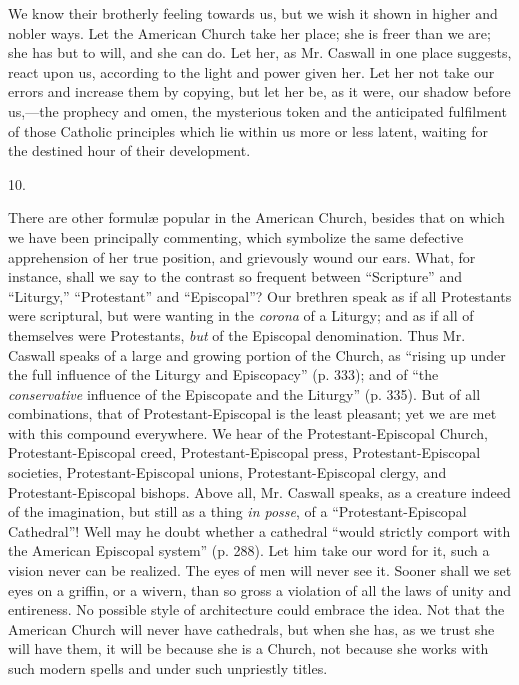 We know their brotherly feeling towards us, but
we wish it shown in higher and nobler ways. Let the American Church
take her place; she is freer than we are; she has but to will, and she
can do. Let her, as Mr. Caswall in one place suggests, react upon us,
according to the light and power given her. Let her not take our
errors and increase them by copying, but let her be, as it were, our
shadow before us,—the prophecy and omen, the mysterious token and
the anticipated fulfilment of those Catholic principles which lie
within us more or less latent, waiting for the destined hour of their
development.

10.

There are other formulæ popular in the American
Church, besides that on which we have been principally commenting,
which symbolize the same defective apprehension of her true position,
and grievously wound our ears. What, for instance, shall we say to the
contrast so frequent between ``Scripture'' and ``Liturgy,'' ``Protestant''
and ``Episcopal''? Our brethren speak as if all Protestants were
scriptural, but were wanting in the \emph{corona} of a Liturgy; and as
if all of themselves were Protestants, \emph{but} of the Episcopal
denomination. Thus Mr. Caswall speaks of a large and growing portion
of the Church, as ``rising up under the full influence of the Liturgy
and Episcopacy'' (p. 333); and of ``the \emph{conservative} influence of
the Episcopate and the Liturgy'' (p. 335). But of all combinations,
that of Protestant-Episcopal is the least pleasant; yet we are met
with this compound everywhere. We hear of the
Protestant-Episcopal Church, Protestant-Episcopal creed,
Protestant-Episcopal press, Protestant-Episcopal societies,
Protestant-Episcopal unions, Protestant-Episcopal clergy, and
Protestant-Episcopal bishops. Above all, Mr. Caswall speaks, as a
creature indeed of the imagination, but still as a thing \emph{in posse},
of a ``Protestant-Episcopal Cathedral''! Well may he doubt whether a
cathedral ``would strictly comport with the American Episcopal system''
(p. 288). Let him take our word for it, such a vision never can be
realized. The eyes of men will never see it. Sooner shall we set eyes
on a griffin, or a wivern, than so gross a violation of all the laws
of unity and entireness. No possible style of architecture could
embrace the idea. Not that the American Church will never have
cathedrals, but when she has, as we trust she will have them, it will
be because she is a Church, not because she works with such modern
spells and under such unpriestly titles.

